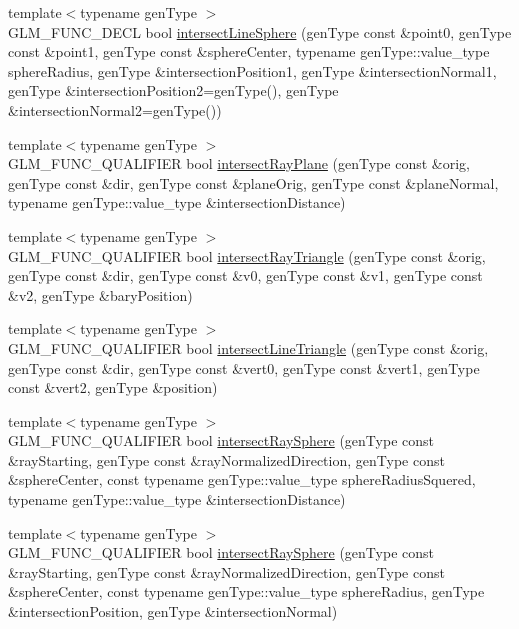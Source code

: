 \begin{DoxyCompactItemize}
\item 
{\footnotesize template$<$typename gen\+Type $>$ }\\G\+L\+M\+\_\+\+F\+U\+N\+C\+\_\+\+D\+E\+C\+L bool \hyperlink{group__gtx__intersect_ga9c68139f3d8a4f3d7fe45f9dbc0de5b7}{intersect\+Line\+Sphere} (gen\+Type const \&point0, gen\+Type const \&point1, gen\+Type const \&sphere\+Center, typename gen\+Type\+::value\+\_\+type sphere\+Radius, gen\+Type \&intersection\+Position1, gen\+Type \&intersection\+Normal1, gen\+Type \&intersection\+Position2=gen\+Type(), gen\+Type \&intersection\+Normal2=gen\+Type())
\item 
{\footnotesize template$<$typename gen\+Type $>$ }\\G\+L\+M\+\_\+\+F\+U\+N\+C\+\_\+\+Q\+U\+A\+L\+I\+F\+I\+E\+R bool \hyperlink{group__gtx__intersect_gad3697a9700ea379739a667ea02573488}{intersect\+Ray\+Plane} (gen\+Type const \&orig, gen\+Type const \&dir, gen\+Type const \&plane\+Orig, gen\+Type const \&plane\+Normal, typename gen\+Type\+::value\+\_\+type \&intersection\+Distance)
\item 
{\footnotesize template$<$typename gen\+Type $>$ }\\G\+L\+M\+\_\+\+F\+U\+N\+C\+\_\+\+Q\+U\+A\+L\+I\+F\+I\+E\+R bool \hyperlink{group__gtx__intersect_gab16c1b47c10451e7604b51b39a7ef21d}{intersect\+Ray\+Triangle} (gen\+Type const \&orig, gen\+Type const \&dir, gen\+Type const \&v0, gen\+Type const \&v1, gen\+Type const \&v2, gen\+Type \&bary\+Position)
\item 
{\footnotesize template$<$typename gen\+Type $>$ }\\G\+L\+M\+\_\+\+F\+U\+N\+C\+\_\+\+Q\+U\+A\+L\+I\+F\+I\+E\+R bool \hyperlink{group__gtx__intersect_ga9d29b9b3acb504d43986502f42740df4}{intersect\+Line\+Triangle} (gen\+Type const \&orig, gen\+Type const \&dir, gen\+Type const \&vert0, gen\+Type const \&vert1, gen\+Type const \&vert2, gen\+Type \&position)
\item 
{\footnotesize template$<$typename gen\+Type $>$ }\\G\+L\+M\+\_\+\+F\+U\+N\+C\+\_\+\+Q\+U\+A\+L\+I\+F\+I\+E\+R bool \hyperlink{group__gtx__intersect_gac88f8cd84c4bcb5b947d56acbbcfa56e}{intersect\+Ray\+Sphere} (gen\+Type const \&ray\+Starting, gen\+Type const \&ray\+Normalized\+Direction, gen\+Type const \&sphere\+Center, const typename gen\+Type\+::value\+\_\+type sphere\+Radius\+Squered, typename gen\+Type\+::value\+\_\+type \&intersection\+Distance)
\item 
{\footnotesize template$<$typename gen\+Type $>$ }\\G\+L\+M\+\_\+\+F\+U\+N\+C\+\_\+\+Q\+U\+A\+L\+I\+F\+I\+E\+R bool \hyperlink{group__gtx__intersect_gad28c00515b823b579c608aafa1100c1d}{intersect\+Ray\+Sphere} (gen\+Type const \&ray\+Starting, gen\+Type const \&ray\+Normalized\+Direction, gen\+Type const \&sphere\+Center, const typename gen\+Type\+::value\+\_\+type sphere\+Radius, gen\+Type \&intersection\+Position, gen\+Type \&intersection\+Normal)

\end{DoxyCompactItemize}

